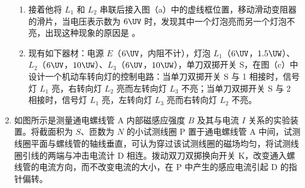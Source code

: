 \documentclass[\gkver]{gaokaozhenti}
\begin{document}
\begin{enumerate}
\begin{enumerate}
	\item
	接着他将 $L_{1}$ 和 $L_{2}$ 串联后接入图（a）中的虚线框位置，移动滑动变阻器的滑片，当电压表示数为 $6\UV$ 时，发现其中一个灯泡亮而另一个灯泡不亮，出现这种现象的原因是 \tkanswer[5.0cm]{}。
	
	\item
	现有如下器材：电源 $E$（$6\UV$，内阻不计），灯泡 $L_{1}$（$6\UV$，$1.5\UW$）、$L_{2}$（$6\UV$，$10\UW$）、$L_{3}$（$6\UV$，$10\UW$），单刀双掷开关 S，在图（c）中设计一个机动车转向灯的控制电路：当单刀双掷开关 S 与 1 相接时，信号灯 $L_{1}$ 亮，右转向灯 $L_{2}$ 亮而左转向灯 $L_{3}$ 不亮；当单刀双掷开关 S 与 2 相接时，信号灯 $L_{1}$ 亮，左转向灯 $L_{3}$ 亮而右转向灯 $L_{2}$ 不亮。
\end{enumerate}

\threepicture[labelA=2008上海18a, labelB=2008上海18b, labelC=2008上海18c, align=right, hA=4.68cm, hB=7.47cm, hC=5.99cm]
{}
{}
{}



\item
如图所示是测量通电螺线管 A 内部磁感应强度 $B$ 及其与电流 $I$ 关系的实验装置。将截面积为 $S$、匝数为 $N$ 的小试测线圈 P 置于通电螺线管 A 中间，试测线圈平面与螺线管的轴线垂直，可认为穿过该试测线圈的磁场均匀，将试测线圈引线的两端与冲击电流计 D 相连。拨动双刀双掷换向开关 K，改变通入螺线管的电流方向，而不改变电流的大小，在 P 中产生的感应电流引起 D 的指针偏转。


\end{enumerate}
\end{document}
